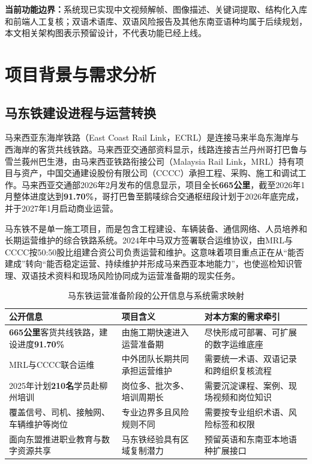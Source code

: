 \documentclass[UTF8,a4paper,zihao=-4]{ctexart}
\newcommand{\keynum}[1]{\textcolor{railred}{\bfseries #1}}
\begin{document}
\noindent\textcolor{railred}{\bfseries 当前功能边界：}系统现已实现中文视频解帧、图像描述、关键词提取、结构化入库和前端人工复核；双语术语库、双语风险报告及其他东南亚语种均属于后续规划，本文相关架构图表示预留设计，不代表功能已经上线。

\section{项目背景与需求分析}

\subsection{马东铁建设进程与运营转换}

马来西亚东海岸铁路（East Coast Rail Link，ECRL）是连接马来半岛东海岸与西海岸的客货共线铁路。马来西亚交通部资料显示，线路连接吉兰丹州哥打巴鲁与雪兰莪州巴生港，由马来西亚铁路衔接公司（Malaysia Rail Link，MRL）持有项目与资产，中国交通建设股份有限公司（CCCC）承担工程、采购、施工和调试工作\cite{mot-ecrl-overview}。马来西亚交通部2026年2月发布的信息显示，项目全长\keynum{665公里}，截至2026年1月整体进度达到\keynum{91.70\%}，哥打巴鲁至鹅唛综合交通枢纽段计划于2026年底完成，并于2027年1月启动商业运营\cite{mot-ecrl-progress-2026}。

马东铁不是单一施工项目，而是包含工程建设、车辆装备、通信网络、人员培养和长期运营维护的综合铁路系统。2024年中马双方签署联合运维协议，由MRL与CCCC按50:50股比组建合资公司负责运营和维护\cite{ecrl-joint-operation}。这意味着项目重点正在从“能否建成”转向“能否稳定运营、持续维护并形成马来西亚本地能力”，也使巡检知识管理、双语技术资料和现场风险协同成为运营准备期的现实任务。

\begin{table}[H]
\centering
\caption{马东铁运营准备阶段的公开信息与系统需求映射}
\label{tab:ecrl-needs}
\small
\begin{tabularx}{\textwidth}{p{}p{}X}
\toprule
公开信息 & 项目含义 & 对本方案的需求牵引 \\
\midrule
\keynum{665公里}客货共线铁路，建设进度\keynum{91.70\%} & 由施工期快速进入运营准备期 & 尽快形成可部署、可扩展的数字运维底座 \\
MRL与CCCC联合运维 & 中外团队长期共同承担运营维护 & 需要统一术语、双语记录和跨组织复核流程 \\
2025年计划\keynum{210名}学员赴柳州培训 & 岗位多、批次多、培训周期长 & 需要沉淀课程、案例、现场视频和岗位知识 \\
覆盖信号、司机、接触网、车辆维护等岗位 & 专业边界多且风险规则不同 & 需要按专业组织术语、风险标签和权限 \\
面向东盟推进职业教育与数字资源共享 & 马东铁经验具有区域复制潜力 & 预留英语和东南亚本地语种扩展接口 \\
\bottomrule
\end{tabularx}
\end{table}
\end{document}
